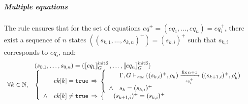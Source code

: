 \begin{skippableproof}
    \subparagraph{Multiple equations}
    The rule  ensures that for the set of equations
    $eq^+ = (eq_1, \dots, eq_n) = eq_i^+$, there exist a sequence of $n$ states $((s_{k,1}, \dots,
        s_{k,n})^+) = (s_{k, i})^+$ such that $s_{k, i}$ corresponds to $eq_i$, and:
    \begin{equation*}
        \begin{array}{ll}
                              & (s_{0, 1}, \dots, s_{0, n}) = (\initstate{eq_1}, \dots, \initstate{eq_n}) \\
            \forall k \in \N, &
            \left\{
            \begin{array}{ll}
                       & ck[k] = \true \, \Rightarrow \,
                \left\{
                \begin{array}{ll}
                           & \fixsem{n+1}{\rho_k}{(s_{k, i})^+}{eq_i^+}{(s_{k+1, i})^+}{\rho'_k} \\
                    \wedge & s_k = (s_{k, i})^+                                                  \\
                \end{array}
                \right.                                     \\
                \wedge & ck[k] \neq \true \, \Rightarrow \,
                \left\{
                \begin{array}{ll}
                     & (s_{k+1, i})^+ = (s_{k, i})^+ \\
                \end{array}
                \right.                                     \\
            \end{array}
            \right.
        \end{array}
    \end{equation*}


\end{skippableproof}
